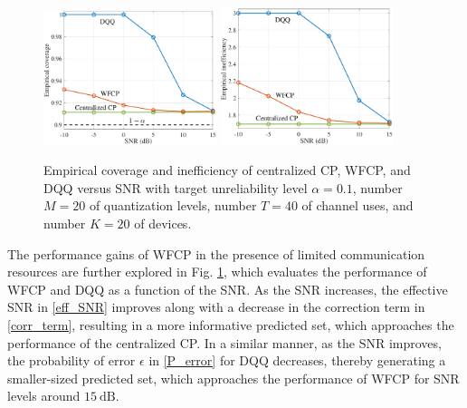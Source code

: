 \documentclass[12pt, draftclsnofoot, onecolumn]{IEEEtran}
\begin{document}
\begin{figure}[t]
    \centering
    {
	\includegraphics[width = 0.45\textwidth]{./figures/cover_SNR.pdf}
	\includegraphics[width = 0.45\textwidth]{./figures/ineff_SNR.pdf}
	}
    \caption{Empirical coverage and inefficiency of centralized CP, WFCP, and DQQ \cite{FedCP-QQ} versus SNR with target unreliability level $\alpha=0.1$, number $M=20$ of quantization levels, number $T=40$ of channel uses, and number $K=20$ of devices.}
    \label{performance_SNR}
\end{figure}
The performance gains of WFCP in the presence of limited communication resources are further explored in Fig. \ref{performance_SNR}, which evaluates the performance of WFCP and DQQ as a function of the SNR. As the SNR increases, the effective SNR in \eqref{eff_SNR} improves along with a decrease in the correction term in \eqref{corr_term}, resulting in a more informative predicted set, which approaches the performance of the centralized CP. In a similar manner, as the SNR improves, the probability of error $\epsilon$ in \eqref{P_error} for DQQ decreases, thereby generating a smaller-sized predicted set, which approaches the performance of WFCP for SNR levels around $15~\text{dB}$.
\end{document}
